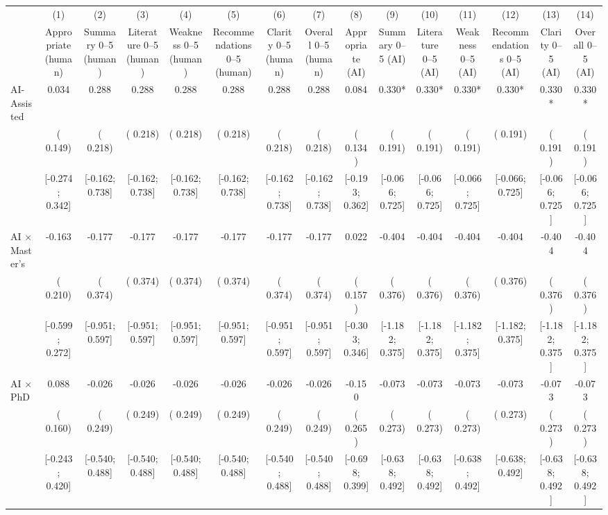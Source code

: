 \def\sym#1{\ifmmode^{#1}\else\(^{#1}\)\fi}
\begin{tabular}{l*{14}{c}}
\hline\hline
 & (1) & (2) & (3) & (4) & (5) & (6) & (7) & (8) & (9) & (10) & (11) & (12) & (13) & (14)
\\
 & Appropriate (human) & Summary 0–5 (human) & Literature 0–5 (human) & Weakness 0–5 (human) & Recommendations 0–5 (human) & Clarity 0–5 (human) & Overall 0–5 (human) & Appropriate (AI) & Summary 0–5 (AI) & Literature 0–5 (AI) & Weakness 0–5 (AI) & Recommendations 0–5 (AI) & Clarity 0–5 (AI) & Overall 0–5 (AI)
 \\
\hline
AI-Assisted &  0.034 &  0.288 &  0.288 &  0.288 &  0.288 &  0.288 &  0.288 &  0.084 &  0.330* &  0.330* &  0.330* &  0.330* &  0.330* &  0.330*
\\
 & ( 0.149) & ( 0.218) & ( 0.218) & ( 0.218) & ( 0.218) & ( 0.218) & ( 0.218) & ( 0.134) & ( 0.191) & ( 0.191) & ( 0.191) & ( 0.191) & ( 0.191) & ( 0.191)
\\
 & [-0.274;  0.342] & [-0.162;  0.738] & [-0.162;  0.738] & [-0.162;  0.738] & [-0.162;  0.738] & [-0.162;  0.738] & [-0.162;  0.738] & [-0.193;  0.362] & [-0.066;  0.725] & [-0.066;  0.725] & [-0.066;  0.725] & [-0.066;  0.725] & [-0.066;  0.725] & [-0.066;  0.725]
\\
AI × Master's & -0.163 & -0.177 & -0.177 & -0.177 & -0.177 & -0.177 & -0.177 &  0.022 & -0.404 & -0.404 & -0.404 & -0.404 & -0.404 & -0.404
\\
 & ( 0.210) & ( 0.374) & ( 0.374) & ( 0.374) & ( 0.374) & ( 0.374) & ( 0.374) & ( 0.157) & ( 0.376) & ( 0.376) & ( 0.376) & ( 0.376) & ( 0.376) & ( 0.376)
\\
 & [-0.599;  0.272] & [-0.951;  0.597] & [-0.951;  0.597] & [-0.951;  0.597] & [-0.951;  0.597] & [-0.951;  0.597] & [-0.951;  0.597] & [-0.303;  0.346] & [-1.182;  0.375] & [-1.182;  0.375] & [-1.182;  0.375] & [-1.182;  0.375] & [-1.182;  0.375] & [-1.182;  0.375]
\\
AI × PhD &  0.088 & -0.026 & -0.026 & -0.026 & -0.026 & -0.026 & -0.026 & -0.150 & -0.073 & -0.073 & -0.073 & -0.073 & -0.073 & -0.073
\\
 & ( 0.160) & ( 0.249) & ( 0.249) & ( 0.249) & ( 0.249) & ( 0.249) & ( 0.249) & ( 0.265) & ( 0.273) & ( 0.273) & ( 0.273) & ( 0.273) & ( 0.273) & ( 0.273)
\\
 & [-0.243;  0.420] & [-0.540;  0.488] & [-0.540;  0.488] & [-0.540;  0.488] & [-0.540;  0.488] & [-0.540;  0.488] & [-0.540;  0.488] & [-0.698;  0.399] & [-0.638;  0.492] & [-0.638;  0.492] & [-0.638;  0.492] & [-0.638;  0.492] & [-0.638;  0.492] & [-0.638;  0.492]

\end{tabular}
